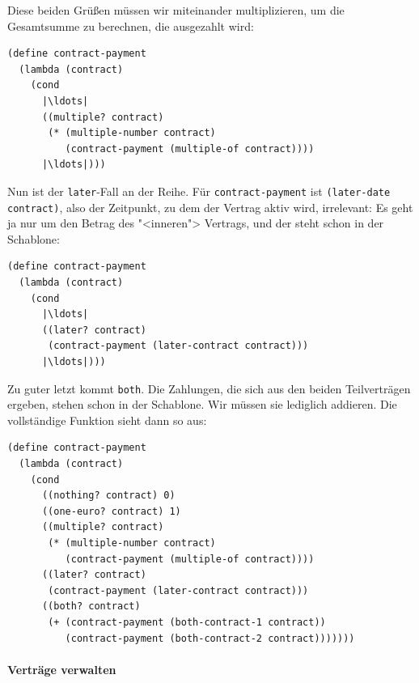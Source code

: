 % 
Diese beiden Grüßen müssen wir miteinander multiplizieren, um die
Gesamtsumme zu berechnen, die ausgezahlt wird:
%
\begin{lstlisting}
(define contract-payment
  (lambda (contract)
    (cond
      |\ldots|
      ((multiple? contract)
       (* (multiple-number contract)
          (contract-payment (multiple-of contract))))
      |\ldots|)))
\end{lstlisting}
%
Nun ist der \texttt{later}-Fall an der Reihe.  Für
\lstinline{contract-payment} ist \lstinline{(later-date contract)},
also der Zeitpunkt, zu dem der Vertrag aktiv wird, irrelevant: Es geht
ja nur um den Betrag des "<inneren"> Vertrags, und der steht schon in
der Schablone:
%
\begin{lstlisting}
(define contract-payment
  (lambda (contract)
    (cond
      |\ldots|
      ((later? contract)
       (contract-payment (later-contract contract)))
      |\ldots|)))
\end{lstlisting}
%
Zu guter letzt kommt \lstinline{both}.  Die Zahlungen, die sich aus
den beiden Teilverträgen ergeben, stehen schon in der Schablone.  Wir
müssen sie lediglich addieren.  Die vollständige Funktion sieht dann
so aus:
%
\begin{lstlisting}
(define contract-payment
  (lambda (contract)
    (cond
      ((nothing? contract) 0)
      ((one-euro? contract) 1)
      ((multiple? contract)
       (* (multiple-number contract)
          (contract-payment (multiple-of contract))))
      ((later? contract)
       (contract-payment (later-contract contract)))
      ((both? contract)
       (+ (contract-payment (both-contract-1 contract))
          (contract-payment (both-contract-2 contract)))))))
\end{lstlisting}

\paragraph{Verträge verwalten}

